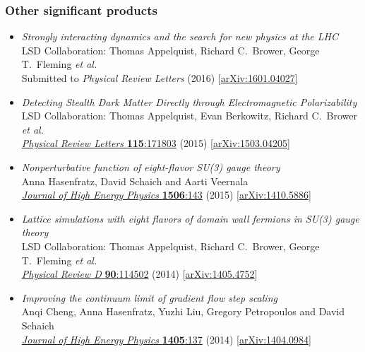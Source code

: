 \documentclass[12 pt]{article}
\begin{document}
\newpage
\subsubsection*{Other significant products} %
\begin{itemize}
  \item {\em Strongly interacting dynamics and the search for new physics at the LHC} \\
        LSD Collaboration: Thomas Appelquist, Richard C.~Brower, George T.~Fleming {\em et al.} \\
        Submitted to {\em Physical Review Letters} (2016) [\href{http://arxiv.org/abs/1601.04027}{arXiv:1601.04027}]
  \item {\em Detecting Stealth Dark Matter Directly through Electromagnetic Polarizability} \\
        LSD Collaboration: Thomas Appelquist, Evan Berkowitz, Richard C.~Brower {\em et al.} \\
        \href{http://dx.doi.org/10.1103/PhysRevLett.115.171803}{{\em Physical Review Letters} {\bf 115}:171803} (2015) [\href{http://arxiv.org/abs/1503.04205}{arXiv:1503.04205}]
  \item {\em Nonperturbative \be function of eight-flavor SU(3) gauge theory} \\
        Anna Hasenfratz, David Schaich and Aarti Veernala \\
        \href{http://dx.doi.org/10.1007/JHEP06(2015)143}{{\em Journal of High Energy Physics} {\bf 1506}:143} (2015) [\href{http://arxiv.org/abs/1410.5886}{arXiv:1410.5886}]
  \item {\em Lattice simulations with eight flavors of domain wall fermions in SU(3) gauge theory} \\
        LSD Collaboration: Thomas Appelquist, Richard C.~Brower, George T.~Fleming {\em et al.} \\
        \href{http://dx.doi.org/10.1103/PhysRevD.90.114502}{{\em Physical Review D} {\bf 90}:114502} (2014) [\href{http://arxiv.org/abs/1405.4752}{arXiv:1405.4752}]
  \item {\em Improving the continuum limit of gradient flow step scaling} \\
        Anqi Cheng, Anna Hasenfratz, Yuzhi Liu, Gregory Petropoulos and David Schaich \\
        \href{http://dx.doi.org/10.1007/JHEP05(2014)137}{{\em Journal of High Energy Physics} {\bf 1405}:137} (2014) [\href{http://arxiv.org/abs/1404.0984}{arXiv:1404.0984}]
\end{itemize}
\end{document}
